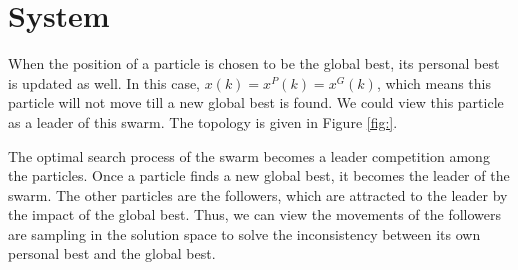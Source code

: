 \section{System}
\label{sec:system}

When the position of a particle is chosen to be the global best, its personal best is updated as well.
In this case, $ x(k) = x^{P}(k) = x^{G}(k) $, which means this particle will not move till a new global best is found.
We could view this particle as a leader of this swarm.
The topology is given in Figure \ref{fig:}.

The optimal search process of the swarm becomes a leader competition among the particles.
Once a particle finds a new global best, it becomes the leader of the swarm.
The other particles are the followers, which are attracted to the leader by the impact of the global best.
Thus, we can view the movements of the followers are sampling in the solution space to solve the inconsistency between its own personal best and the global best.

